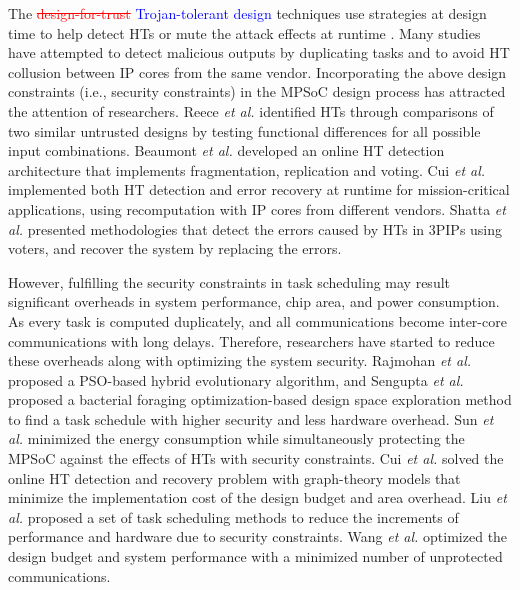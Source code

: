 \documentclass[10pt,journal, compsoc]{IEEEtran}
\begin{document}
The \textcolor{red}{\sout{design-for-trust}} \textcolor{blue}{Trojan-tolerant design} techniques use strategies at design time to help detect HTs or mute the attack effects at runtime \cite{article:JR3}. Many studies have attempted to detect malicious outputs by duplicating tasks and to avoid HT collusion between IP cores from the same vendor. Incorporating the above design constraints (i.e., security constraints) in the MPSoC design process has attracted the attention of researchers. Reece \textit{et al.} \cite{article:TR} identified HTs through comparisons of two similar untrusted designs by testing functional differences for all possible input combinations. Beaumont \textit{et al.} \cite{conference:MB} developed an online HT detection architecture that implements fragmentation, replication and voting. Cui \textit{et al.} \cite{conference:XC} implemented both HT detection and error recovery at runtime for mission-critical applications, using recomputation with IP cores from different vendors. Shatta \textit{et al.} \cite{conference:MS} presented methodologies that detect the errors caused by HTs in 3PIPs using voters, and recover the system by replacing the errors.









However, fulfilling the security constraints in task scheduling may result significant overheads in system performance, chip area, and power consumption. As every task is computed duplicately, and all communications become inter-core communications with long delays. Therefore, researchers have started to reduce these overheads along with optimizing the system security. Rajmohan \textit{et al.} \cite{article:SR} proposed a PSO-based hybrid evolutionary algorithm, and Sengupta \textit{et al.} \cite{conference:AS} proposed a bacterial foraging optimization-based design space exploration method to find a task schedule with higher security and less hardware overhead. Sun \textit{et al.} \cite{article:YS} minimized the energy consumption while simultaneously protecting the MPSoC against the effects of HTs with security constraints. Cui \textit{et al.} \cite{article:XC} solved the online HT detection and recovery problem with graph-theory models that minimize the implementation cost of the design budget and area overhead. Liu \textit{et al.}\cite{article:CL} proposed a set of task scheduling methods to reduce the increments of performance and hardware due to security constraints. Wang \textit{et al.} \cite{article:NW, conference:NW} optimized the design budget and system performance with a minimized number of unprotected communications.
\end{document}
